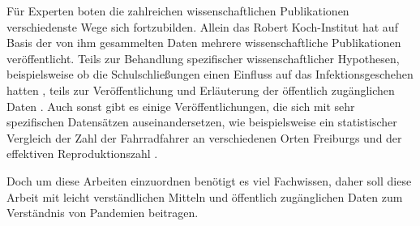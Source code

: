 Für Experten boten die zahlreichen wissenschaftlichen Publikationen verschiedenste Wege sich fortzubilden. Allein das Robert Koch-Institut hat auf Basis der von ihm gesammelten Daten mehrere wissenschaftliche Publikationen veröffentlicht. Teils zur Behandlung spezifischer wissenschaftlicher Hypothesen, beispielsweise ob die Schulschließungen einen Einfluss auf das Infektionsgeschehen hatten \autocite{OtteimKampe2020Surveillance}, teils zur Veröffentlichung und Erläuterung der öffentlich zugänglichen Daten \autocite{RKI_Bulletin}. Auch sonst gibt es einige Veröffentlichungen, die sich mit sehr spezifischen Datensätzen auseinandersetzen, wie beispielsweise ein statistischer Vergleich der Zahl der Fahrradfahrer an verschiedenen Orten Freiburgs und  der effektiven Reproduktionszahl \autocite{Fabian}.


Doch um diese Arbeiten einzuordnen benötigt es viel Fachwissen, daher soll diese Arbeit mit leicht verständlichen Mitteln und öffentlich zugänglichen Daten zum Verständnis von Pandemien beitragen.
